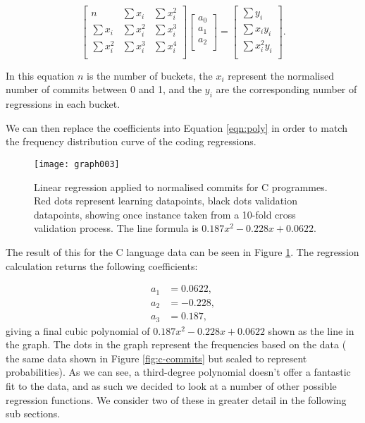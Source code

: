 \documentclass[10pt,journal,compsoc]{IEEEtran}
\begin{document}
\begin{equation}
\begin{bmatrix}
n          & \sum x_i   & \sum x_i^2 \\
\sum x_i   & \sum x_i^2 & \sum x_i^3 \\
\sum x_i^2 & \sum x_i^3 & \sum x_i^4 \\
\end{bmatrix}
\begin{bmatrix}
a_0 \\
a_1 \\
a_2 \\
\end{bmatrix}
=
\begin{bmatrix}
\sum y_i \phantom{x_i} \\
\sum x_i y_i           \\
\sum x_i^2 y_i         \\
\end{bmatrix}.
\end{equation}

In this equation $n$ is the number of buckets, the $x_i$ represent the normalised number of commits between 0 and 1, and the $y_i$ are the corresponding number of regressions in each bucket.

We can then replace the coefficients into Equation \ref{eqn:poly} in order to match the frequency distribution curve of the coding regressions.

\begin{figure}[t]
\centering
\texttt{[image: graph003]}%
\caption{\label{fig:c-linear}Linear regression applied to normalised commits for C programmes. Red dots represent learning datapoints, black dots validation datapoints, showing once instance taken from a 10-fold cross validation process. The line formula is $0.187x^{2} - 0.228x + 0.0622$.}
\end{figure}

The result of this for the C language data can be seen in Figure \ref{fig:c-linear}. The regression calculation returns the following coefficients:

\begin{align*}
a_1 & = 0.0622, \\
a_2 & = -0.228, \\
a_3 & = 0.187,
\end{align*}
giving a final cubic polynomial of $0.187x^{2} - 0.228x + 0.0622$ shown as the line in the graph. The dots in the graph represent the frequencies based on the data (\ie\/ the same data shown in Figure \ref{fig:c-commits} but scaled to represent probabilities). As we can see, a third-degree polynomial doesn't offer a fantastic fit to the data, and as such we decided to look at a number of other possible regression functions. We consider two of these in greater detail in the following sub sections.
\end{document}
